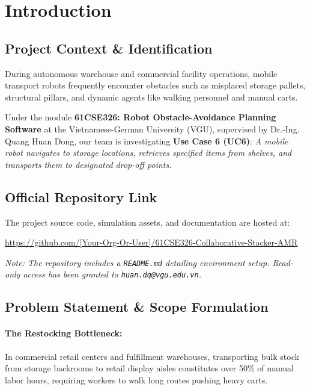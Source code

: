\documentclass[12pt,a4paper]{article}
\begin{document}
\newpage

\pagestyle{fancy}
\fancyhf{}
\rfoot{\thepage}

\section{Introduction}

\subsection{Project Context \& Identification}
During autonomous warehouse and commercial facility operations, mobile transport robots frequently encounter obstacles such as misplaced storage pallets, structural pillars, and dynamic agents like walking personnel and manual carts. 

Under the module \textbf{61CSE326: Robot Obstacle-Avoidance Planning Software} at the Vietnamese-German University (VGU), supervised by Dr.-Ing. Quang Huan Dong, our team is investigating \textbf{Use Case 6 (UC6)}: \textit{A mobile robot navigates to storage locations, retrieves specified items from shelves, and transports them to designated drop-off points}.

\subsection{Official Repository Link}
The project source code, simulation assets, and documentation are hosted at:
\begin{center}
    \url{https://github.com/[Your-Org-Or-User]/61CSE326-Collaborative-Stacker-AMR}
\end{center}
\noindent
\textit{Note: The repository includes a \texttt{README.md} detailing environment setup. Read-only access has been granted to \texttt{huan.dq@vgu.edu.vn}.}

\subsection{Problem Statement \& Scope Formulation}
\paragraph{The Restocking Bottleneck:}
In commercial retail centers and fulfillment warehouses, transporting bulk stock from storage backrooms to retail display aisles constitutes over 50\% of manual labor hours, requiring workers to walk long routes pushing heavy carts.
\end{document}
